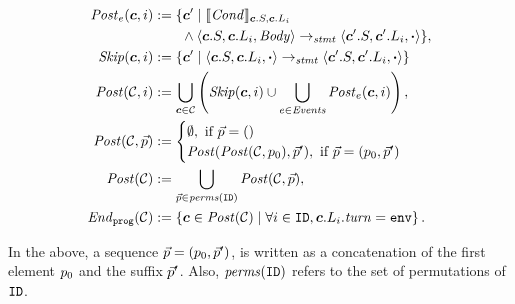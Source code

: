\begin{mdframed}[
    skipabove=5pt, skipbelow=5pt,
    innertopmargin=0pt,
    innerleftmargin=0pt, innerrightmargin=0pt
]
\footnotesize
\newcommand{\Skip}{\mathit{Skip}\xspace}
\begin{align*}
    \Post_\Ev(\gconfig,i) &:= \{ \gconfig' \mid \eec{\EvCond}{\gconfig.S, \gconfig.\lconfig{i}} \\
      & \ \ \ \ \ \ \land \left\langle \gconfig.S, \gconfig.\lconfig{i}, \EvBody \right\rangle \stmtrule \left\langle \gconfig'.S, \gconfig'.\lconfig{i}, \EndEvent \right\rangle\}, \\
    \Skip(\gconfig,i) &:= \{ \gconfig' \mid \left\langle \gconfig.S, \gconfig.\lconfig{i}, \EndEvent \right\rangle \stmtrule \left\langle \gconfig'.S, \gconfig'.\lconfig{i}, \EndEvent \right\rangle \} \\
    \Post(\gset,i) &:=  \bigcup_{\gconfig\in\gset} \left(\Skip(\gconfig, i) \cup \bigcup_{\Ev \in \Event} \Post_\Ev(\gconfig, i) \right),\\
    \Post(\gset,\pvec) &:= 
        \begin{cases}
            \emptyset, \text{ if } \pvec=()\\
            \Post(\Post(\gset,\pinit),\pvec'), \text{ if } \pvec=(\pinit, \pvec')\\
        \end{cases}\\
    \Post(\gset) &:=  \bigcup_{\pvec\in \mathit{perms}(\UINS)} \Post(\gset,\pvec), \\
    \Final(\gset) &:=  \left\{ \gconfig\in \Post(\gset)\mid \forall i \in \UINS, \gconfig.\lconfig{i}.\turn = \env \right\}.
\end{align*}
\end{mdframed}
In the above, a sequence $\vec{p}=(p_0, \vec{p}')$, is written  as a concatenation of the first element $p_0$ and the suffix $\vec{p}'$.
Also, $\mathit{perms}(\texttt{ID})$ refers to the set of permutations of $\texttt{ID}$.

